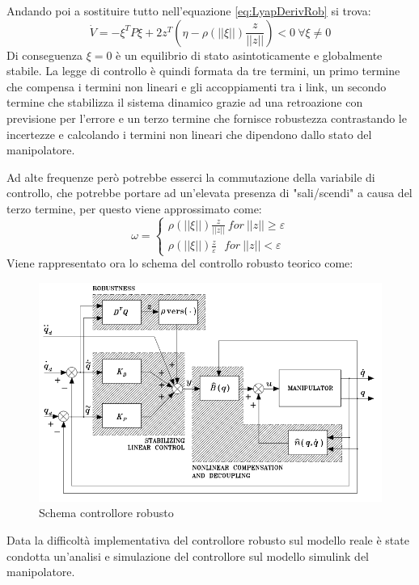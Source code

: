 Andando poi a sostituire tutto nell'equazione \ref{eq:LyapDerivRob} si trova:
\begin{equation}
\dot{V} = -\xi^T P \xi + 2z^T(\eta-\rho(||\xi||) \frac{z}{||z||}) <0 \ \forall
\xi \neq 0
\end{equation}
Di conseguenza $\xi = 0$ è un equilibrio di stato asintoticamente e globalmente stabile. La legge di controllo è quindi formata da tre termini, un primo termine che compensa i termini non lineari e gli accoppiamenti tra i link, un secondo termine che stabilizza il sistema dinamico grazie ad una retroazione con previsione per l'errore e un terzo termine che fornisce robustezza contrastando le incertezze e calcolando i termini non lineari che dipendono dallo stato del manipolatore. 
\\[15pt]
\par Ad alte frequenze però potrebbe esserci la commutazione della variabile di controllo, che potrebbe portare ad un'elevata presenza di "sali/scendi" a causa del terzo termine, per questo viene approssimato come:
\begin{equation}
\omega = \begin{cases}
\rho(||\xi||) \frac{z}{||z||} \ for\ ||z||\ge \varepsilon \\
\rho(||\xi||) \frac{z}{\varepsilon} \ \ \ for \ ||z|| < \varepsilon
\end{cases}
\label{eq:epsilon}
\end{equation}
Viene rappresentato ora lo schema del controllo robusto teorico come:
\begin{figure}[ht]
	\begin{center}
		\includegraphics[scale=0.8]{Immagini/Controllori/RobustTeoria}
		\caption{Schema controllore robusto}
		\label{fig:RobustSchema}
	\end{center}
\end{figure}
Data la difficoltà implementativa del controllore robusto sul modello reale è state condotta un'analisi e simulazione del controllore sul modello simulink del manipolatore.

